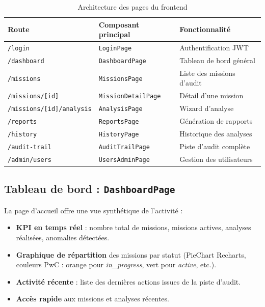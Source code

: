 \documentclass[12pt,a4paper,twoside]{report}
\begin{document}
\begin{table}[H]
\centering
\caption{Architecture des pages du frontend}
\label{tab:pages}
\begin{tabular}{lll}
\toprule
\textbf{Route}                              & \textbf{Composant principal}  & \textbf{Fonctionnalité} \\
\midrule
\texttt{/login}                             & \texttt{LoginPage}            & Authentification JWT \\
\texttt{/dashboard}                         & \texttt{DashboardPage}        & Tableau de bord général \\
\texttt{/missions}                          & \texttt{MissionsPage}         & Liste des missions d'audit \\
\texttt{/missions/[id]}                     & \texttt{MissionDetailPage}    & Détail d'une mission \\
\texttt{/missions/[id]/analysis}            & \texttt{AnalysisPage}         & Wizard d'analyse \\
\texttt{/reports}                           & \texttt{ReportsPage}          & Génération de rapports \\
\texttt{/history}                           & \texttt{HistoryPage}          & Historique des analyses \\
\texttt{/audit-trail}                       & \texttt{AuditTrailPage}       & Piste d'audit complète \\
\texttt{/admin/users}                       & \texttt{UsersAdminPage}       & Gestion des utilisateurs \\
\bottomrule
\end{tabular}
\end{table}

\subsection{Tableau de bord : \texttt{DashboardPage}}

La page d'accueil offre une vue synthétique de l'activité :

\begin{itemize}
  \item \textbf{KPI en temps réel} : nombre total de missions, missions actives, analyses réalisées, anomalies détectées.
  \item \textbf{Graphique de répartition} des missions par statut (PieChart Recharts, couleurs PwC : orange pour \textit{in\_progress}, vert pour \textit{active}, etc.).
  \item \textbf{Activité récente} : liste des dernières actions issues de la piste d'audit.
  \item \textbf{Accès rapide} aux missions et analyses récentes.
\end{itemize}
\end{document}
